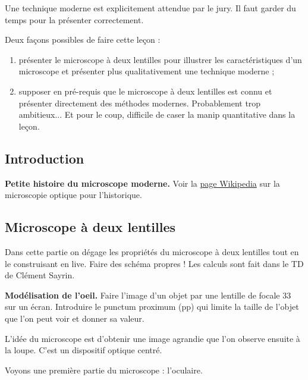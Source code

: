 \begin{remarque}
Une technique moderne est explicitement attendue par le jury.
Il faut garder du temps pour la présenter correctement.

\noindent
Deux façons possibles de faire cette leçon :
\begin{enumerate}
\item présenter le microscope à deux lentilles pour illustrer les caractéristiques d'un microscope et présenter plus qualitativement une technique moderne ;
\item supposer en pré-requis que le microscope à deux lentilles est connu et présenter directement des méthodes modernes.
Probablement trop ambitieux...
Et pour le coup, difficile de caser la manip quantitative dans la leçon.
\end{enumerate}
\end{remarque}

\subsection*{Introduction}

\begin{slide}
\textbf{Petite histoire du microscope moderne.}
Voir la \href{https://fr.wikipedia.org/wiki/Microscope_optique}{page Wikipedia} sur la microscopie optique pour l'historique.
\end{slide}

\subsection{Microscope à deux lentilles}

Dans cette partie on dégage les propriétés du microscope à deux lentilles tout en le construisant en live.
Faire des schéma propres !
Les calculs sont fait dans le TD de Clément Sayrin.

\begin{experience}
\textbf{Modélisation de l'oeil.}
Faire l'image d'un objet par une lentille de focale \unit{33}{\centi\meter} sur un écran.
Introduire le punctum proximum (pp) qui limite la taille de l'objet que l'on peut voir et donner sa valeur.
\end{experience}

L'idée du microscope est d'obtenir une image agrandie que l'on observe ensuite à la loupe.
C'est un dispositif optique centré.

\begin{transition}
Voyons une première partie du microscope : l'oculaire.
\end{transition}


